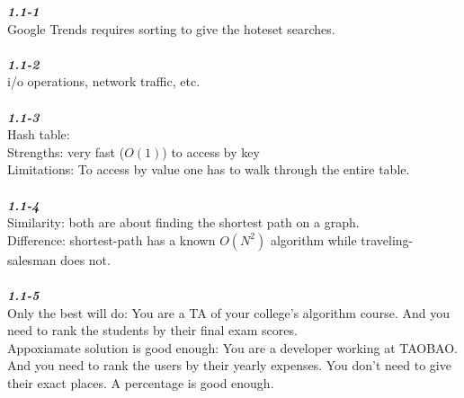 \textbf{\textsl{1.1-1}} \\
Google Trends requires sorting to give the hoteset searches. \\
\\
\textbf{\textsl{1.1-2}} \\
i/o operations, network traffic, etc. \\
\\
\textbf{\textsl{1.1-3}} \\
Hash table: \\
Strengths: very fast ($O(1)$) to access by key \\
Limitations: To access by value one has to walk through the entire table. \\
\\
\textbf{\textsl{1.1-4}} \\
Similarity: both are about finding the shortest path on a graph. \\
Difference: shortest-path has a known $O(N^2)$ algorithm while traveling-salesman does not. \\
\\
\textbf{\textsl{1.1-5}} \\
Only the best will do: You are a TA of your college's algorithm course. And you need
to rank the students by their final exam scores. \\
Appoxiamate solution is good enough: You are a developer working at TAOBAO. And you need to rank the users by their yearly expenses. You don't need to give their exact places. A percentage is good enough. \\



